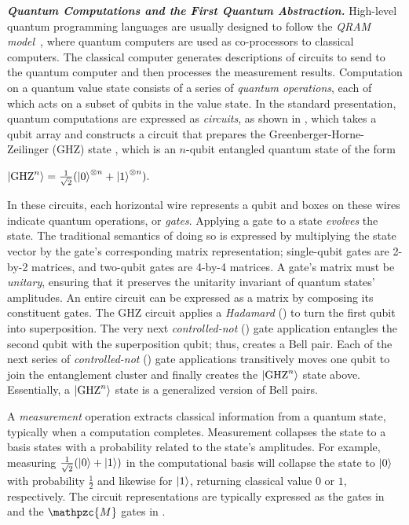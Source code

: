 \begin{figure}[t]
            {

         }
  \label{fig:background-circuit-example}
\end{figure}

\noindent\textbf{\textit{Quantum Computations and the First Quantum Abstraction.}} High-level quantum programming languages are usually designed to follow the \emph{QRAM model}~\cite{Knill1996}, where quantum computers are used as co-processors to classical computers. The classical computer generates descriptions of circuits to send to the quantum computer and then processes the measurement results.
Computation on a quantum value state consists of a series of \emph{quantum operations}, each of which acts on a subset of qubits in the value state. 
In the standard presentation, quantum computations are expressed as \emph{circuits}, as shown in ,
which takes a qubit array and constructs a circuit that prepares the Greenberger-Horne-Zeilinger (GHZ) state \cite{Greenberger1989}, which is an $n$-qubit entangled quantum state of the form
{
\begin{center}
$
    \ket{\text{GHZ}^n} = \frac{1}{\sqrt{2}}(\ket{0}^{\otimes n}+\ket{1}^{\otimes n}).
$
\end{center}
}
In these circuits, each horizontal wire represents a qubit and boxes on these wires indicate quantum operations, or \emph{gates}. 
Applying a gate to a state \emph{evolves} the state. The traditional semantics of doing so is expressed by multiplying the state vector by the gate's corresponding matrix representation; single-qubit gates are 2-by-2 matrices, and two-qubit gates are 4-by-4 matrices. A gate's matrix must be \emph{unitary}, ensuring that it preserves the unitarity invariant of quantum states' amplitudes. An entire circuit can be expressed as a matrix by composing its constituent gates.
The GHZ circuit applies a \emph{Hadamard} () to turn the first qubit into superposition. The very next \emph{controlled-not} () gate application entangles the second qubit with the superposition qubit; thus, creates a Bell pair.
Each of the next series of \emph{controlled-not} () gate applications transitively moves one qubit to join the entanglement cluster and finally creates the $\ket{\text{GHZ}^n}$ state above. Essentially, a $\ket{\text{GHZ}^n}$ state is a generalized version of Bell pairs.

A \emph{measurement} operation extracts classical information from a quantum state, typically when a computation completes. Measurement collapses the state to a basis states with a probability related to the state's amplitudes. For example, measuring $\frac{1}{\sqrt{2}}(\ket{0} + \ket{1})$ in the computational basis will collapse the state to $\ket{0}$ with probability $\frac{1}{2}$ and likewise for $\ket{1}$, returning classical value $0$ or $1$, respectively.
The circuit representations are typically expressed as the  gates in  and the $\mathpzc{M}$ gates in .

